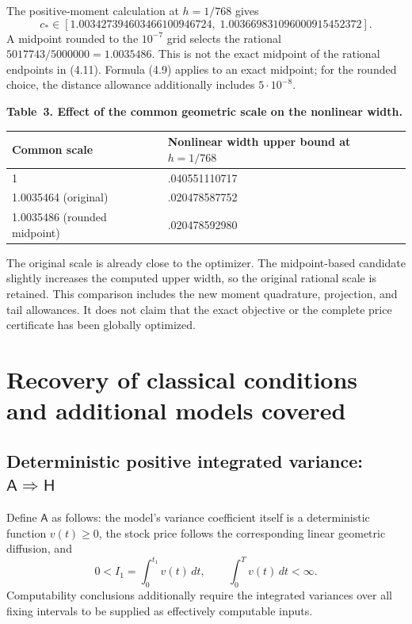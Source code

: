 The positive-moment calculation at \(h=1/768\) gives
\[
c_*\in[1.003427394603466100946724,\;1.003669831096000915452372].
\tag{4.11}
\]
A midpoint rounded to the \(10^{-7}\) grid selects the rational
\(5017743/5000000=1.0035486\). This is not the exact midpoint of the rational
endpoints in (4.11). Formula (4.9) applies to an exact midpoint; for the rounded
choice, the distance allowance additionally includes \(5\cdot10^{-8}\).

\noindent\textbf{Table~3. Effect of the common geometric scale on the nonlinear width.}
\begin{center}
\begin{tabularx}{\textwidth}{@{}l X@{}}
\toprule
Common scale & Nonlinear width upper bound at \(h=1/768\) \\
\midrule
1 & .040551110717 \\
1.0035464 (original) & .020478587752 \\
1.0035486 (rounded midpoint) & .020478592980 \\
\bottomrule
\end{tabularx}
\end{center}

The original scale is already close to the optimizer. The midpoint-based
candidate slightly increases the computed upper width, so the original rational
scale is retained. This comparison includes the new moment quadrature, projection,
and tail allowances. It does not claim that the exact objective or the complete price
certificate has been globally optimized.


\section{Recovery of classical conditions and additional models covered}

\subsection{Deterministic positive integrated variance: \(\mathsf A\Rightarrow\mathsf H\)}

Define \(\mathsf A\) as follows: the model's variance coefficient itself is a deterministic function \(v(t)\ge0\), the stock price follows the corresponding linear geometric diffusion, and
\[
0<I_1=\int_0^{t_1}v(t)\,dt,\qquad \int_0^T v(t)\,dt<\infty.
\tag{5.1}
\]
Computability conclusions additionally require the integrated variances over all fixing intervals to be supplied as effectively computable inputs.

